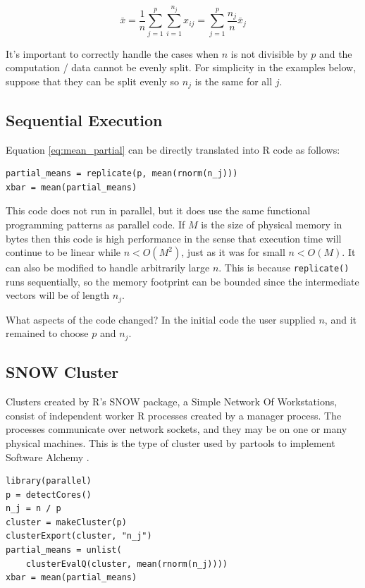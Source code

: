 \documentclass[12pt]{article}
\begin{document}
\begin{equation}
    \bar{x} = \frac{1}{n} \sum_{j = 1}^p \sum_{i = 1}^{n_j} x_{ij}
    = \sum_{j = 1}^p \frac{n_j}{n} \bar{x}_j
\label{eq:mean_partial}
\end{equation}

It's important to correctly handle the cases when $n$ is not divisible by $p$
and the computation / data cannot be evenly split. For simplicity in the
examples below, suppose that they can be split evenly so $n_j$ is the same
for all $j$.

\subsection{Sequential Execution}
\label{section:sequential}

Equation \ref{eq:mean_partial} can be directly translated into R code as
follows:

\begin{verbatim}
partial_means = replicate(p, mean(rnorm(n_j)))
xbar = mean(partial_means)
\end{verbatim}

This code does not run in parallel, but it does use the same functional
programming patterns as parallel code. If $M$ is the size of physical memory in
bytes then this code is high performance in the sense
that execution time will continue to be linear while $n < O(M^2)$, just
as it was for small $n < O(M)$. It can also be modified to handle
arbitrarily large $n$. This is because \texttt{replicate()} runs
sequentially, so the memory footprint can be bounded since the intermediate
vectors will be of length $n_j$. 

What aspects of the code changed? In the initial code the user
supplied $n$, and it remained to choose $p$ and $n_j$.

\subsection{SNOW Cluster}

Clusters created by R's SNOW package, a Simple Network Of Workstations,
consist of independent worker R processes created by a manager process. The
processes communicate over network sockets, and they may be on one or many
physical machines.  This is the type of cluster used by partools to
implement Software Alchemy \cite{R-partools} \cite{matloff2014software}.  

\begin{verbatim}
library(parallel)
p = detectCores()
n_j = n / p
cluster = makeCluster(p)
clusterExport(cluster, "n_j")
partial_means = unlist(
    clusterEvalQ(cluster, mean(rnorm(n_j))))
xbar = mean(partial_means)
\end{verbatim}
\end{document}
